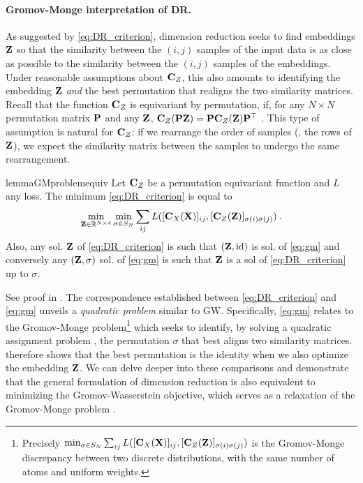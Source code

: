 \paragraph{Gromov-Monge interpretation of DR.} As suggested by
\cref{eq:DR_criterion}, dimension reduction seeks to find embeddings ${\mathbf{Z}}$ so
that the similarity between the $(i,j)$ samples of the input data is as close as
possible to the similarity between the $(i,j)$ samples of the embeddings. Under
reasonable assumptions about ${\mathbf{C}}_{Z}$, this also amounts to identifying the embedding ${\mathbf{Z}}$ \emph{and} the best permutation that realigns the two similarity matrices. %
Recall that the function ${\mathbf{C}}_{Z}$ is equivariant by permutation, if, for any $N \times N$ permutation matrix ${\mathbf{P}}$ and any
${\mathbf{Z}}$, ${\mathbf{C}}_{Z}({\mathbf{P}} {\mathbf{Z}}) = {\mathbf{P}} {\mathbf{C}}_{Z}({\mathbf{Z}}) {\mathbf{P}}^\top$ \cite{bronstein2021geometric}.
This type of assumption is natural for ${\mathbf{C}}_{Z}$: if we rearrange the order of
samples (\ie, the rows of ${\mathbf{Z}}$), we expect the similarity matrix between the
samples to undergo the same rearrangement. 
\begin{restatable}{lemma}{GMproblemequiv}
\label{lemma:GMproblemequiv}
Let ${\mathbf{C}}_{Z}$ be a permutation equivariant function and $L$ any loss. The minimum \cref{eq:DR_criterion} is equal to 
\begin{equation}
\label{eq:gm}
\min_{{\mathbf{Z}} \in \mathbb{R}^{N \times d}} \min_{\sigma \in S_N} \sum_{ij} L([{\mathbf{C}}_{X}({\mathbf{X}})]_{ij}, [{\mathbf{C}}_{Z}({\mathbf{Z}})]_{\sigma(i) \sigma(j)}) \:.
\end{equation}
Also, any sol. ${\mathbf{Z}}$ of \cref{eq:DR_criterion} is such that $({\mathbf{Z}}, \operatorname{id})$ is sol. of \cref{eq:gm} and conversely any $({\mathbf{Z}}, \sigma)$ sol. of \cref{eq:gm} is such that ${\mathbf{Z}}$ is a sol of \cref{eq:DR_criterion} up to $\sigma$.
\end{restatable}
See proof in . The correspondence established between \cref{eq:DR_criterion} and \cref{eq:gm}
unveils a \emph{quadratic problem} similar to GW. Specifically, \cref{eq:gm} relates to
the Gromov-Monge problem\footnote{Precisely $\min_{\sigma \in S_N} \sum_{ij} L([{\mathbf{C}}_{X}({\mathbf{X}})]_{ij}, [{\mathbf{C}}_{Z}({\mathbf{Z}})]_{\sigma(i) \sigma(j)})$ is the Gromov-Monge discrepancy between two discrete distributions, with the same number of atoms and uniform weights.}
\cite{memoli2018gromov} which seeks to identify, by solving a quadratic assignment problem \cite{cela2013quadratic}, the permutation $\sigma$ that best
aligns two similarity matrices.  therefore shows that the best permutation is the identity when we also optimize the embedding ${\mathbf{Z}}$.
We can delve deeper into these comparisons and demonstrate that the general formulation of dimension reduction is also equivalent to minimizing the Gromov-Wasserstein objective, which serves as a relaxation of the Gromov-Monge problem \cite{memoli2022comparison}.


